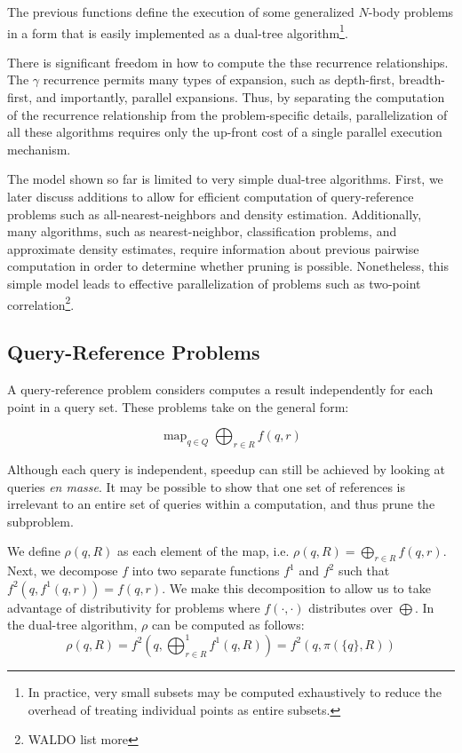 \documentclass[times, 10pt,twocolumn]{article}
\DeclareMathOperator*{\map}{map}
\newcommand{\allrho}{\rho}
\begin{document}
\noindent The previous functions define the execution of some generalized $N$-body problems in a form that is easily implemented as a dual-tree algorithm\footnote{In practice, very small subsets may be computed exhaustively to reduce the overhead of treating individual points as entire subsets.}.

There is significant freedom in how to compute the thse recurrence relationships.
The $\gamma$ recurrence permits many types of expansion, such as depth-first, breadth-first, and importantly, parallel expansions.
Thus, by separating the computation of the recurrence relationship from the problem-specific details, parallelization of all these algorithms requires only the up-front cost of a single parallel execution mechanism.

The model shown so far is limited to very simple dual-tree algorithms.
First, we later discuss additions to allow for efficient computation of query-reference problems such as all-nearest-neighbors and density estimation.
Additionally, many algorithms, such as nearest-neighbor, classification problems, and approximate density estimates, require information about previous pairwise computation in order to determine whether pruning is possible.
Nonetheless, this simple model leads to effective parallelization of problems such as two-point correlation\footnote{WALDO list more}.

\subsection{Query-Reference Problems}


A query-reference problem considers computes a result independently for each point in a query set.
These problems take on the general form:
 
  $$\map_{q \in Q} \bigoplus_{r \in R} f(q, r)$$

Although each query is independent, speedup can still be achieved by looking at queries {\it en masse}.
It may be possible to show that one set of references is irrelevant to an entire set of queries within a computation, and thus prune the subproblem.

We define $\allrho(q, R)$ as each element of the map, i.e. $\allrho(q, R) = \bigoplus_{r \in R} f(q, r)$.
Next, we decompose $f$ into two separate functions $f^1$ and $f^2$ such that $f^2(q, f^1(q, r)) = f(q, r)$.
We make this decomposition to allow us to take advantage of distributivity for problems where $f(\cdot, \cdot)$ distributes over $\bigoplus$.
In the dual-tree algorithm, $\allrho$ can be computed as follows:
\begin{equation}
  \label{eqn:rho}
  \allrho(q, R) = f^{2}(q, \bigoplus^{1}_{r \in R} f^{1}(q, R)) = f^{2}(q, \pi(\{q\}, R))
  \end{equation}
  
\end{document}
